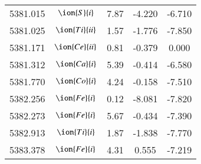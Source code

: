 \documentclass[fleqn,usenatbib]{mnras}
\begin{document}
\begin{center}
\begin{table}
\begin{tabular}{ccccc}
5381.015 &  $\ion{S}{i}$  & 7.87 & -4.220 & -6.710 \\ 
5381.025 &  $\ion{Ti}{ii}$  & 1.57 & -1.776 & -7.850 \\ 
5381.171 &  $\ion{Ce}{ii}$  & 0.81 & -0.379 & 0.000 \\ 
5381.312 &  $\ion{Ca}{i}$  & 5.39 & -0.414 & -6.580 \\ 
5381.770 &  $\ion{Co}{i}$  & 4.24 & -0.158 & -7.510 \\ 
5382.256 &  $\ion{Fe}{i}$  & 0.12 & -8.081 & -7.820 \\ 
5382.273 &  $\ion{Fe}{i}$  & 5.67 & -0.434 & -7.390 \\ 
5382.913 &  $\ion{Ti}{i}$  & 1.87 & -1.838 & -7.770 \\ 
5383.378 &  $\ion{Fe}{i}$  & 4.31 & 0.555 & -7.219 \\ 
 \end{tabular}
 \end{table}
 \end{center}
 
\end{document}
